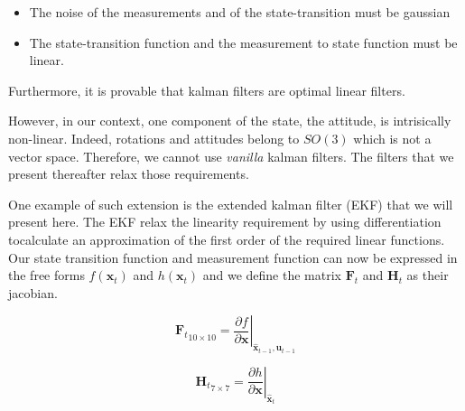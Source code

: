 \documentclass[12pt,]{article}
\providecommand{\tightlist}{%
  \setlength{\itemsep}{0pt}\setlength{\parskip}{0pt}}
\begin{document}
\begin{itemize}
\tightlist
\item
  The noise of the measurements and of the state-transition must be
  gaussian
\item
  The state-transition function and the measurement to state function
  must be linear.
\end{itemize}

Furthermore, it is provable that kalman filters are optimal linear
filters.

However, in our context, one component of the state, the attitude, is
intrisically non-linear. Indeed, rotations and attitudes belong to
\(SO(3)\) which is not a vector space. Therefore, we cannot use
\emph{vanilla} kalman filters. The filters that we present thereafter
relax those requirements.

One example of such extension is the extended kalman filter (EKF) that
we will present here. The EKF relax the linearity requirement by using
differentiation tocalculate an approximation of the first order of the
required linear functions. Our state transition function and measurement
function can now be expressed in the free forms \(f(\mathbf{x}_t)\) and
\(h(\mathbf{x}_t)\) and we define the matrix \(\mathbf{F}_t\) and
\(\mathbf{H}_t\) as their jacobian.

\[{\mathbf{F}_t}_{10 \times 10} = \left . \frac{\partial f}{\partial \mathbf{x} } \right \vert _{\hat{\mathbf{x}}_{t-1},\mathbf{u}_{t-1}}\]

\[{\mathbf{H}_t}_{7 \times 7} = \left . \frac{\partial h}{\partial \mathbf{x} } \right \vert _{\hat{\mathbf{x}}_{t}}\]
\end{document}
